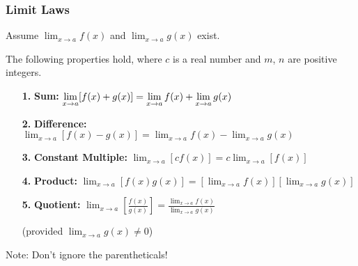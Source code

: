 \documentclass[14pt]{beamer}
\begin{document}
\begin{frame}
\frametitle{Limit Laws}
\small
Assume $\displaystyle\lim_{x \to a} f(x)$ and $\displaystyle\lim_{x \to a} g(x)$ exist.  

The following properties hold, where $c$ is a real number and $m$, $n$ are positive integers.

\vspace{0.75pc}
\begin{itemize}
\item[{\bf 1.}] {\bf Sum:} $\displaystyle\displaystyle\lim_{x \to a} [f(x)+g(x)] = \displaystyle\displaystyle\lim_{x \to a} f(x)+\displaystyle\displaystyle\lim_{x \to a} g(x)$

\vspace{0.5pc}
\item[{\bf 2.}] {\bf Difference:} $\displaystyle\lim_{x \to a} [f(x)-g(x)] = \displaystyle\lim_{x \to a} f(x)-\displaystyle\lim_{x \to a} g(x)$
\end{itemize}
\end{frame}

\begin{frame}
\small
\begin{itemize}
\item[{\bf 3.}] {\bf Constant Multiple:} $\displaystyle\lim_{x \to a} [cf(x)] = c \displaystyle\lim_{x \to a} [f(x)]$

\vspace{0.75pc}
\item[{\bf 4.}] {\bf Product:}  $\displaystyle\lim_{x \to a} [f(x)g(x)] = \left[\displaystyle\lim_{x \to a} f(x)\right] \left[\displaystyle\lim_{x \to a} g(x)\right]$
\end{itemize}
\end{frame}


\begin{frame}
\begin{itemize}
\item[{\bf 5.}] {\bf Quotient:}  $\displaystyle\lim_{x \to a} \left[ \frac{f(x)}{g(x)} \right] = \frac{\displaystyle\lim_{x \to a} f(x)}{\displaystyle\lim_{x \to a} g(x)}$

\vspace{1.2pc}
(provided $\displaystyle\lim_{x \to a} g(x) \ne 0$)
\end{itemize}

\vspace{1pc}
\alert{Note:} Don't ignore the parentheticals!
\end{frame}
\end{document}
